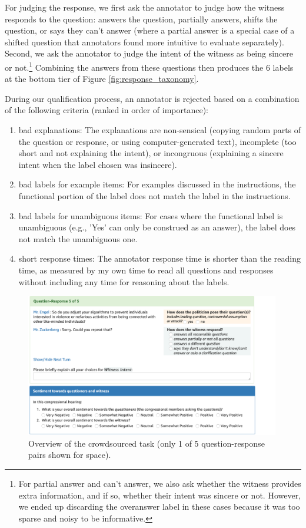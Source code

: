 For judging the response, we first ask the annotator to judge how the witness responds to the question: answers the question, partially answers, shifts the question, or says they can't answer (where a partial answer is a special case of a shifted question that annotators found more intuitive to evaluate separately). Second, we ask the annotator to judge the intent of the witness as being sincere or not.\footnote{For partial answer and can't answer, we also ask whether the witness provides extra information, and if so, whether their intent was sincere or not. However, we ended up discarding the overanswer label in these cases because it was too sparse and noisy to be informative.} Combining the answers from these questions then produces the 6 labels at the bottom tier of Figure \ref{fig:response_taxonomy}. 

During our qualification process, an annotator is rejected based on a combination of the following criteria (ranked in order of importance):
\begin{enumerate}[label=(\roman*)]
\item bad explanations: The explanations are non-sensical (copying random parts of the question or response, or using computer-generated text), incomplete (too short and not explaining the intent), or incongruous (explaining a sincere intent when the label chosen was insincere).
\item bad labels for example items: For examples discussed in the instructions, the functional portion of the label does not match the label in the instructions. 
\item bad labels for unambiguous items: For cases where the functional label is unambiguous (e.g., 'Yes' can only be construed as an answer), the label does not match the unambiguous one. 
\item short response times: The annotator response time is shorter than the reading time, as measured by my own time to read all questions and responses without including any time for reasoning about the labels.
\end{enumerate} 

\begin{figure}
\centering
\includegraphics[width=0.99\textwidth]{plots/subj_amt_screenshots_main.pdf}
\vspace{-.3em}
\caption{Overview of the crowdsourced task (only 1 of 5 question-response pairs shown for space).}
\label{fig:subj_amt_screenshots_main}
\end{figure}

